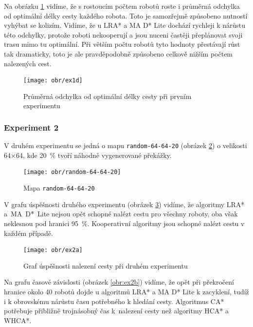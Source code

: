 Na obrázku \ref{obr:ex1d} vidíme, že s rostoucím počtem robotů roste i průměrná odchylka od optimální délky cesty každého robota. Toto je samozřejmě způsobeno nutností vyhýbat se kolizím. Vidíme, že u LRA* a MA D* Lite dochází rychleji k nárůstu této odchylky, protože roboti nekooperují a jsou nuceni častěji přeplánovat svoji trasu mimo tu optimální. Při větším počtu robotů tyto hodnoty přestávají růst tak dramaticky, toto je ale pravděpodobně způsobeno celkově nižším počtem nalezených cest.

\vspace*{-10mm}
\begin{figure}[H]
\begin{center}
	\texttt{[image: obr/ex1d]}
\end{center}
\vspace*{-10mm}
\caption[caption]{Průměrná odchylka od optimální délky cesty při prvním experimentu}
\label{obr:ex1d}
\end{figure}


\subsubsection{Experiment 2}
V druhém experimentu se jedná o mapu \texttt{random-64-64-20} (obrázek \ref{obr:random-64-64-20}) o velikosti 64×64, kde 20~\% tvoří náhodně vygenerované překážky. 

\begin{figure}[htb]
	\begin{center}
		\texttt{[image: obr/random-64-64-20]}
	\end{center}
	\caption[caption]{Mapa \texttt{random-64-64-20}  \cite{Sturtevant2012}}
	\label{obr:random-64-64-20}
\end{figure}

V grafu úspěšnosti druhého experimentu (obrázek \ref{obr:ex2a}) vidíme, že algoritmy LRA* a~MA~D*~Lite nejsou opět schopné nalézt cestu pro všechny roboty, oba však neklesnou pod hranici 95~\%. Kooperativní algoritmy jsou schopné nalézt cestu v každém případě.

\vspace*{-10mm}
\begin{figure}[H]
	\begin{center}
		\texttt{[image: obr/ex2a]}
	\end{center}
	\vspace*{-10mm}
	\caption[caption]{Graf úspěšnosti nalezení cesty při druhém experimentu}
	\label{obr:ex2a}
\end{figure}
\clearpage
Na grafu časové závislosti (obrázek \ref{obr:ex2b}) vidíme, že opět při překročení hranice okolo 40 robotů dojde u algoritmů LRA* a MA D* Lite k zacyklení, tudíž i k obrovskému nárůstu času potřebného k hledání cesty. Algoritmus CA* potřebuje přibližně trojnásobný čas k~nalezení cesty než algoritmy HCA* a WHCA*.

